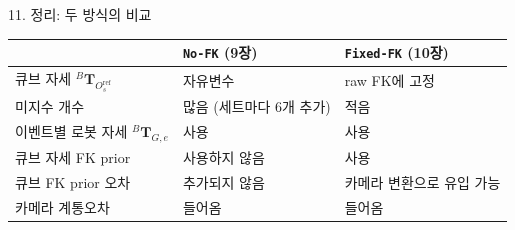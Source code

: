 \documentclass[aspectratio=169,11pt]{beamer}
\newcommand{\T}[3][]{{}^{#2}\mathbf{T}^{#1}_{#3}}   %
\newcommand{\Oref}{O^{\mathrm{ref}}}   %
\begin{document}
\begin{frame}{11. 정리: 두 방식의 비교}
  \begin{center}
    \small
    \begin{tabular}{lll}
      \toprule
       & \texttt{No-FK} (9장) & \texttt{Fixed-FK} (10장) \\
      \midrule
      큐브 자세 $\T{B}{\Oref_s}$ & 자유변수 & raw FK에 고정 \\
      미지수 개수 & 많음 (세트마다 $6$개 추가) & 적음 \\
      이벤트별 로봇 자세 $\T{B}{G,e}$ & 사용 & 사용 \\
      큐브 자세 FK prior & 사용하지 않음 & 사용 \\
      큐브 FK prior 오차 & 추가되지 않음 & 카메라 변환으로 유입 가능 \\
      카메라 계통오차 & 들어옴 & 들어옴 \\
      \bottomrule
    \end{tabular}
  \end{center}
\end{frame}
\fi
\end{document}
